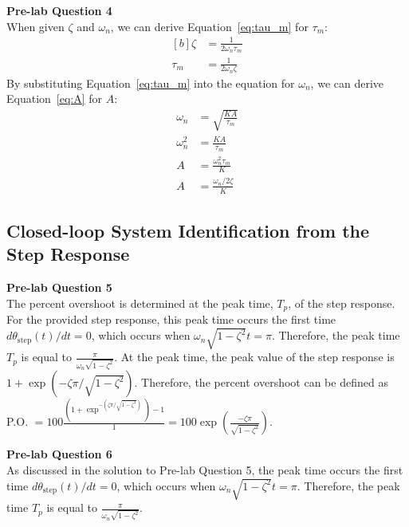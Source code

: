 \documentclass[12pt]{article}
\begin{document}
\textbf{Pre-lab Question 4} \\
When given $\zeta$ and $\omega_n$, we can derive Equation~\ref{eq:tau_m} for $\tau_m$:
\begin{equation} \label{eq:tau_m}
\begin{aligned}[b]
    \zeta &= \frac{1}{2\omega_n\tau_m} \\
    \tau_m &= \frac{1}{2\omega_n\zeta}
\end{aligned}
\end{equation}
By substituting Equation~\ref{eq:tau_m} into the equation for $\omega_n$, we can derive Equation~\ref{eq:A} for $A$:
\begin{equation} \label{eq:A}
\begin{aligned}
    \omega_n &= \sqrt{\frac{KA}{\tau_m}} \\
    \omega_n^2 &= \frac{KA}{\tau_m} \\
    A &= \frac{\omega_n^2\tau_m}{K} \\
    A &= \frac{\omega_n / 2\zeta}{K}
\end{aligned}    
\end{equation}


\subsection{Closed-loop System Identification from the Step Response}
\textbf{Pre-lab Question 5} \\
The percent overshoot is determined at the peak time, $T_p$, of the step response. For the provided step response, this peak time occurs the first time $d\theta_{\text{step}}(t)/dt = 0$, which occurs when $\omega_n\sqrt{1-\zeta^2}t = \pi$. Therefore, the peak time $T_p$ is equal to $\frac{\pi}{\omega_n\sqrt{1-\zeta^2}}$. At the peak time, the peak value of the step response is $1 + \exp\left( -\zeta\pi / \sqrt{1-\zeta^2} \right)$. Therefore, the percent overshoot can be defined as P.O. $= 100\frac{(1 + \exp^{-(\zeta\pi / \sqrt{1-\zeta^2})})-1}{1} = 100\exp\left(\frac{-\zeta\pi}{\sqrt{1-\zeta^2}}\right)$.

\textbf{Pre-lab Question 6} \\
As discussed in the solution to Pre-lab Question 5, the peak time occurs the first time $d\theta_{\text{step}}(t)/dt = 0$, which occurs when $\omega_n\sqrt{1-\zeta^2}t = \pi$. Therefore, the peak time $T_p$ is equal to $\frac{\pi}{\omega_n\sqrt{1-\zeta^2}}$.
\end{document}
